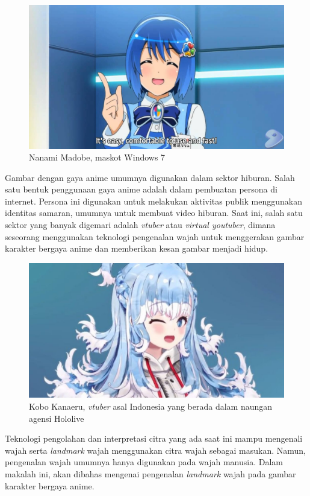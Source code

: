 \documentclass[conference, a4paper]{IEEEtran}
\begin{document}
\begin{figure}[ht]
  \includegraphics[width=\columnwidth]{img/nanami.jpg}
  \caption{Nanami Madobe, maskot Windows 7}
\end{figure}

Gambar dengan gaya anime umumnya digunakan dalam sektor hiburan. Salah satu bentuk penggunaan gaya anime adalah dalam pembuatan persona di internet. Persona ini digunakan untuk melakukan aktivitas publik menggunakan identitas samaran, umumnya untuk membuat video hiburan. Saat ini, salah satu sektor yang banyak digemari adalah \textit{vtuber} atau \textit{virtual youtuber}, dimana seseorang menggunakan teknologi pengenalan wajah untuk menggerakan gambar karakter bergaya anime dan memberikan kesan gambar menjadi hidup.

\begin{figure}[ht]
  \includegraphics[width=\columnwidth]{img/kobo.jpg}
  \caption{Kobo Kanaeru, \textit{vtuber} asal Indonesia yang berada dalam naungan agensi Hololive}
\end{figure}

Teknologi pengolahan dan interpretasi citra yang ada saat ini mampu mengenali wajah serta \textit{landmark} wajah menggunakan citra wajah sebagai masukan. Namun, pengenalan wajah umumnya hanya digunakan pada wajah manusia. Dalam makalah ini, akan dibahas mengenai pengenalan \textit{landmark} wajah pada gambar karakter bergaya anime.
\end{document}
